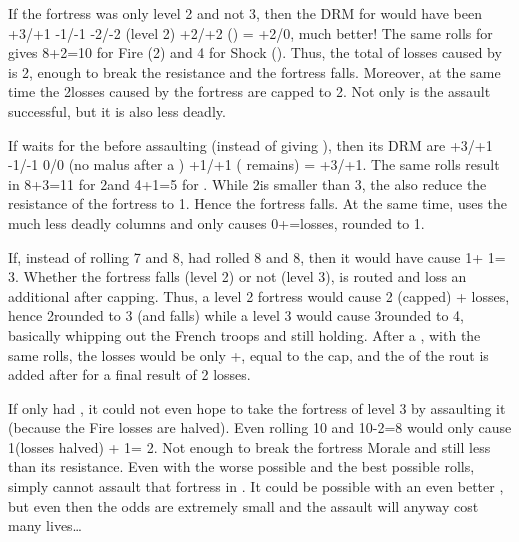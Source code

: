 \begin{exemple}
  If the fortress was only level 2 and not 3, then the DRM for \FRA would have
  been +3/+1 -1/-1 -2/-2 (level 2) +2/+2 () = +2/0,
  much better! The same rolls for \FRA gives 8+2=10 for Fire
  (2\textetoile\textetoile) and 4 for Shock (\texttu). Thus, the total of
  losses caused by \FRA is 2\texttu, enough to break the resistance and the
  fortress falls. Moreover, at the same time the 2\texttd losses caused by the
  fortress are capped to 2. Not only is the assault successful, but it is also
  less deadly.

  \smallskip

  If \FRA waits for the  before assaulting (instead of giving
  ), then its DRM are +3/+1 -1/-1 0/0 (no malus after a
  ) +1/+1 ( remains) = +3/+1. The same
  rolls result in 8+3=11 for 2\textetoile\textetoile and 4+1=5 for
  \texttd\textetoile. While 2\texttd is smaller than 3, the 
  also reduce the resistance of the fortress to 1. Hence the fortress
  falls. At the same time, \HIS uses the much less deadly 
  columns and only causes 0+\texttd=\texttd losses, rounded to 1.

  \smallskip

  If, instead of rolling 7 and 8, \HIS had rolled 8 and 8, then it would have
  cause 1\texttu\textetoile\textetoile + 1\texttd\textetoile\textetoile =
  3\textetoile\textetoile\textetoile\textetoile. Whether the fortress falls
  (level 2) or not (level 3), \FRA is routed and loss an additional \texttd
  after capping. Thus, a level 2 fortress would cause 2 (capped) + \texttd
  losses, hence 2\texttd rounded to 3 (and falls) while a level 3 would cause
  3\texttd rounded to 4, basically whipping out the French troops and still
  holding. After a , with the same rolls, the losses would be
  only \texttu+, equal to the cap, and the \texttd of the rout is
  added after for a final result of 2 losses.

  \smallskip

  If \FRA only had \TARQ, it could not even hope to take the fortress of level
  3 by assaulting it (because the Fire losses are halved). Even rolling 10 and
  10-2=8 would only cause 1\textetoile\textetoile (losses halved) +
  1\texttd\textetoile = 2\texttd\textetoile\textetoile\textetoile. Not enough
  to break the fortress Morale and still less than its resistance. Even with
  the worse possible \HIS \LeaderG and the best possible rolls, \FRA simply
  cannot assault that fortress in \TARQ. It could be possible with an even
  better \FRA \LeaderG, but even then the odds are extremely small and the
  assault will anyway cost many lives\ldots
\end{exemple}

